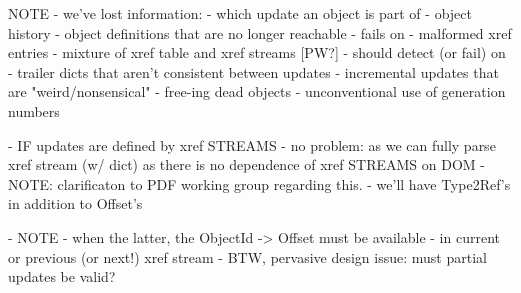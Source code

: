 NOTE
 - we've lost information:
   - which update an object is part of
   - object history
   - object definitions that are no longer reachable
 - fails on
   - malformed xref entries
   - mixture of xref table and xref streams [PW?]
 - should detect (or fail) on
   - trailer dicts that aren't consistent between updates
   - incremental updates that are "weird/nonsensical"
     - free-ing dead objects
     - unconventional use of generation numbers
         
 - IF updates are defined by xref STREAMS
   - no problem: as we can fully parse xref stream (w/ dict) as
     there is no dependence of xref STREAMS on DOM
     - NOTE: clarificaton to PDF working group regarding this.
   - we'll have Type2Ref's in addition to Offset's
      
 - NOTE 
   - when the latter, the ObjectId -> Offset must be available
       - in current or previous (or next!) xref stream
         - BTW, pervasive design issue: must partial updates be valid?




